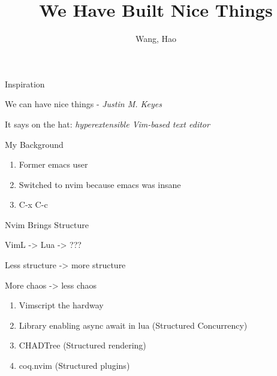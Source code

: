 \documentclass{beamer}
\title{We Have Built Nice Things}
\author{Wang, Hao}
\institute{Lead Engineer @ Graveflex}
\date{}
\begin{document}
\begin{frame}


	\titlepage

\end{frame}


\begin{frame}{Inspiration}


	We can have nice things - \em{Justin M. Keyes}

	It says on the hat: \em{hyperextensible} Vim-based text editor

\end{frame}


\begin{frame}{My Background}

	\begin{enumerate}

		\item Former emacs user

		\item Switched to nvim because emacs was insane

		\item C-x C-c


	\end{enumerate}


\end{frame}


\begin{frame}{Nvim Brings Structure}

	VimL -> Lua -> ???

	Less structure -> more structure

	More chaos -> less chaos

	\begin{enumerate}

		\item Vimscript the hardway


		\item Library enabling async await in lua (Structured Concurrency)


		\item CHADTree (Structured rendering)


		\item coq.nvim (Structured plugins)


	\end{enumerate}

\end{frame}
\end{document}
